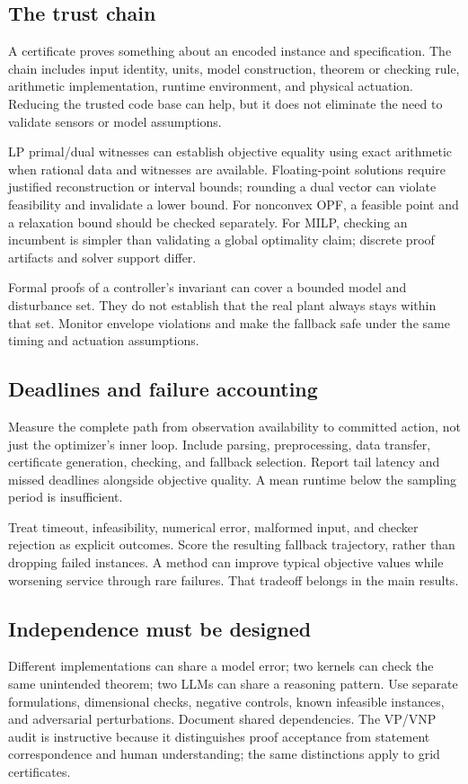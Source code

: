 \documentclass[11pt,letterpaper]{article}
\begin{document}
\subsection{The trust chain}
A certificate proves something about an encoded instance and specification. The chain includes input identity, units, model construction, theorem or checking rule, arithmetic implementation, runtime environment, and physical actuation. Reducing the trusted code base can help, but it does not eliminate the need to validate sensors or model assumptions.

LP primal/dual witnesses can establish objective equality using exact arithmetic when rational data and witnesses are available. Floating-point solutions require justified reconstruction or interval bounds; rounding a dual vector can violate feasibility and invalidate a lower bound. For nonconvex OPF, a feasible point and a relaxation bound should be checked separately. For MILP, checking an incumbent is simpler than validating a global optimality claim; discrete proof artifacts and solver support differ.

Formal proofs of a controller's invariant can cover a bounded model and disturbance set. They do not establish that the real plant always stays within that set. Monitor envelope violations and make the fallback safe under the same timing and actuation assumptions.

\subsection{Deadlines and failure accounting}
Measure the complete path from observation availability to committed action, not just the optimizer's inner loop. Include parsing, preprocessing, data transfer, certificate generation, checking, and fallback selection. Report tail latency and missed deadlines alongside objective quality. A mean runtime below the sampling period is insufficient.

Treat timeout, infeasibility, numerical error, malformed input, and checker rejection as explicit outcomes. Score the resulting fallback trajectory, rather than dropping failed instances. A method can improve typical objective values while worsening service through rare failures. That tradeoff belongs in the main results.

\subsection{Independence must be designed}
Different implementations can share a model error; two kernels can check the same unintended theorem; two LLMs can share a reasoning pattern. Use separate formulations, dimensional checks, negative controls, known infeasible instances, and adversarial perturbations. Document shared dependencies. The VP/VNP audit is instructive because it distinguishes proof acceptance from statement correspondence and human understanding; the same distinctions apply to grid certificates.
\end{document}
